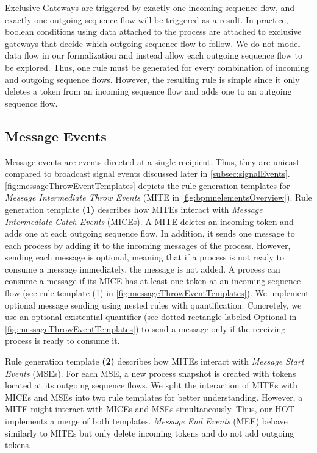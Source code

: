 \documentclass{lmcs} %
\begin{document}
Exclusive Gateways are triggered by exactly one incoming sequence flow, and exactly one outgoing sequence flow will be triggered as a result.
In practice, boolean conditions using data attached to the process are attached to exclusive gateways that decide which outgoing sequence flow to follow.
We do not model data flow in our formalization and instead allow each outgoing sequence flow to be explored. 
Thus, one rule must be generated for every combination of incoming and outgoing sequence flows.
However, the resulting rule is simple since it only deletes a token from an incoming sequence flow and adds one to an outgoing sequence flow.

\subsection{Message Events}
Message events are events directed at a single recipient.
Thus, they are unicast compared to broadcast signal events discussed later in \autoref{subsec:signalEvents}.
\autoref{fig:messageThrowEventTemplates} depicts the rule generation templates for \textit{Message Intermediate Throw Events} (\textsf{MITE} in \autoref{fig:bpmnelementsOverview}).
Rule generation template \textbf{(1)} describes how MITEs interact with \textit{Message Intermediate Catch Events} (MICEs).
A MITE deletes an incoming token and adds one at each outgoing sequence flow.
In addition, it sends one message to each process by adding it to the incoming messages of the process.
However, sending each message is optional, meaning that if a process is not ready to consume a message immediately, the message is not added.
A process can consume a message if its MICE has at least one token at an incoming sequence flow (see rule template (1) in \autoref{fig:messageThrowEventTemplates}).
We implement optional message sending using nested rules with quantification.
Concretely, we use an optional existential quantifier \cite{rensinkNestedQuantificationGraph2006} (see dotted rectangle labeled \textsf{Optional} in \autoref{fig:messageThrowEventTemplates}) to send a message only if the receiving process is ready to consume it.

Rule generation template \textbf{(2)} describes how MITEs interact with \textit{Message Start Events} (MSEs).
For each MSE, a new process snapshot is created with tokens located at its outgoing sequence flows.
We split the interaction of MITEs with MICEs and MSEs into two rule templates for better understanding.
However, a MITE might interact with MICEs and MSEs simultaneously.
Thus, our HOT implements a merge of both templates. 
\textit{Message End Events} (\textsf{MEE}) behave similarly to MITEs but only delete incoming tokens and do not add outgoing tokens.
\end{document}
